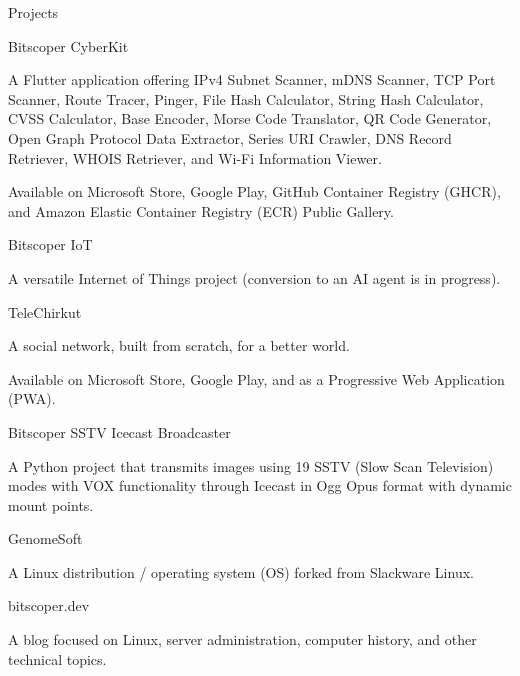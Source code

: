 \documentclass[
	a4paper,
	12pt,
]{resume}
\begin{document}
\begin{rSection}{Projects}

	\begin{rSubsection}{Bitscoper CyberKit}{}{}{}
		\item A Flutter application offering IPv4 Subnet Scanner, mDNS Scanner, TCP Port Scanner, Route Tracer, Pinger, File Hash Calculator, String Hash Calculator, CVSS Calculator, Base Encoder, Morse Code Translator, QR Code Generator, Open Graph Protocol Data Extractor, Series URI Crawler, DNS Record Retriever, WHOIS Retriever, and Wi-Fi Information Viewer.
		\item Available on Microsoft Store, Google Play, GitHub Container Registry (GHCR), and Amazon Elastic Container Registry (ECR) Public Gallery.
	\end{rSubsection}

	\begin{rSubsection}{Bitscoper IoT}{}{}{}
		\item A versatile Internet of Things project (conversion to an AI agent is in progress).
	\end{rSubsection}

	\begin{rSubsection}{TeleChirkut}{}{}{}
		\item A social network, built from scratch, for a better world.
		\item Available on Microsoft Store, Google Play, and as a Progressive Web Application (PWA).
	\end{rSubsection}

	\begin{rSubsection}{Bitscoper SSTV Icecast Broadcaster}{}{}{}
		\item A Python project that transmits images using 19 SSTV (Slow Scan Television) modes with VOX functionality through Icecast in Ogg Opus format with dynamic mount points.
	\end{rSubsection}

	\begin{rSubsection}{GenomeSoft}{}{}{}
		\item A Linux distribution / operating system (OS) forked from Slackware Linux.
	\end{rSubsection}

	\begin{rSubsection}{bitscoper.dev}{}{}{}
		\item A blog focused on Linux, server administration, computer history, and other technical topics.
	\end{rSubsection}

\end{rSection}
\end{document}
